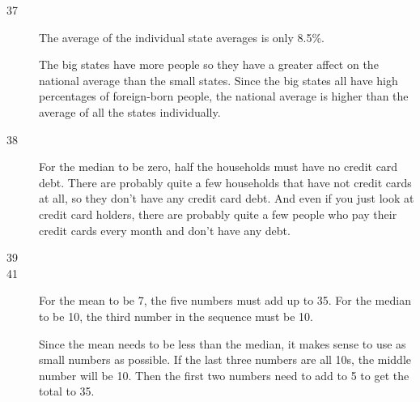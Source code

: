 \documentclass{exam}
\begin{document}
\begin{description}
\begin{parts}
        \end{parts}

      \item[37]
        The average of the individual state averages is only 8.5\%.

        The big states have more people so they have a greater affect on the
        national average than the small states.  Since the big states all have
        high percentages of foreign-born people, the national average is higher
        than the average of all the states individually.

      \item[38]
        For the median to be zero, half the households must have no credit card
        debt.  There are probably quite a few households that have not credit
        cards at all, so they don't have any credit card debt.  And even if you
        just look at credit card holders, there are probably quite a few people
        who pay their credit cards every month and don't have any debt.


      \item[39]

      \item[41]
        For the mean to be 7, the five numbers must add up to 35.  For the
        median to be 10, the third number in the sequence must be 10.

        Since the mean needs to be less than the median, it makes sense to use
        as small numbers as possible.  If the last three numbers are all 10s,
        the middle number will be 10.  Then the first two numbers need to add
        to 5 to get the total to 35.


\end{description}
\end{document}
